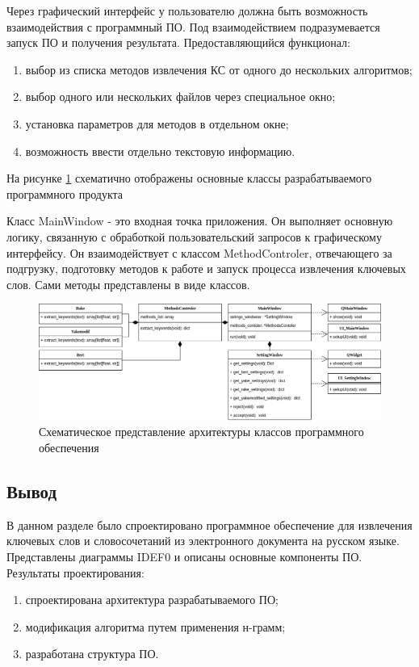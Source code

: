 Через графический интерфейс у пользователю должна быть возможность взаимодействия с программный ПО. 
Под взаимодействием подразумевается запуск ПО и получения результата.
Предоставляющийся функционал:
\begin{enumerate}
	\item выбор из списка методов извлечения КС от одного до нескольких алгоритмов;
	\item выбор одного или нескольких файлов через специальное окно;
	\item установка параметров для методов в отдельном окне;
	\item возможность ввести отдельно текстовую информацию.
\end{enumerate}

На рисунке \ref{fig:classdiagram} схематично отображены основные классы разрабатываемого программного продукта

Класс MainWindow - это входная точка приложения.
Он выполняет основную логику, связанную с обработкой пользовательский запросов к графическому интерфейсу.
Он взаимодействует с классом MethodControler, отвечающего за подгрузку, подготовку методов к работе и запуск процесса извлечения ключевых слов. Сами методы представлены в виде классов.

\begin{figure}[!h]
	\centering
	\includegraphics[width=1\linewidth]{src/img/class_diagram}
	\caption{Схематическое представление архитектуры классов программного обеспечения}
	\label{fig:classdiagram}
\end{figure}

\subsection{Вывод}
В данном разделе было спроектировано программное обеспечение для извлечения ключевых слов и словосочетаний из электронного документа на русском языке. 
Представлены диаграммы IDEF0 и описаны основные компоненты ПО.
Результаты проектирования:
\begin{enumerate}
	\item спроектирована архитектура разрабатываемого ПО;
	\item модификация алгоритма путем применения н-грамм;
	\item разработана структура ПО.
\end{enumerate}


